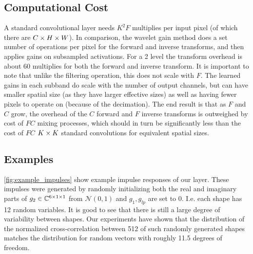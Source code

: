 \begin{figure}[ht]
  \centering
  \makebox[\textwidth][c]{%
    \resizebox{1.1\textwidth}{!}{}
  }
  \label{fig:fwd_bwd}
\end{figure}

\subsection{Computational Cost}
A standard convolutional layer needs $K^2 F$ multiplies per input pixel (of which there are $C\x H\x
W$). In comparison, the wavelet gain method does a set number of operations per pixel for the
forward and inverse transforms, and then applies gains on subsampled activations. For a 2 level
\DTCWT the transform overhead is about 60 multiplies for both the forward and inverse transform. It
is important to note that unlike the filtering operation, this does not scale with $F$. The learned
gains in each subband do scale with the number of output channels, but can have smaller spatial size
(as they have larger effective sizes) as well as having fewer pixels to operate on (because of the
decimation). The end result is that as $F$ and $C$ grow, the overhead of the $C$ forward and $F$
inverse transforms is outweighed by cost of $FC$ mixing processes, which should in turn be
significantly less than the cost of $FC$ $K\x K$ standard convolutions for equivalent spatial sizes.
\subsection{Examples}
\autoref{fig:example_impulses} show example impulse responses of our layer. These impulses were generated by
randomly initializing both the real and imaginary parts of $g_2 \in \complexes[6\x 1\x 1]$ 
from $\mathcal{N}(0,1)$ and $g_1, g_{lp}$ are set to 0. I.e. each shape has 12 random variables. It
is good to see that there is still a large degree of variability between shapes. Our experiments
have shown that the distribution of the normalized cross-correlation between 512 of such randomly generated shapes
matches the distribution for random vectors with roughly 11.5 degrees of freedom.
